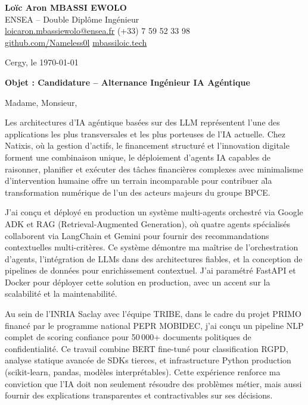 \documentclass[a4paper,11pt]{article}
\begin{document}
\noindent
\textbf{Lo\"ic Aron MBASSI EWOLO} \\
ENSEA -- Double Dipl\^ome Ing\'enieur \\
\href{mailto:loicaron.mbassiewolo@ensea.fr}{loicaron.mbassiewolo@ensea.fr} \quad (+33) 7 59 52 33 98 \\
\href{https://github.com/Nameless0l}{github.com/Nameless0l} \quad \href{https://mbassiloic.tech}{mbassiloic.tech}

\vspace{1em}
\noindent Cergy, le \today

\vspace{1em}
\noindent \textbf{Objet : Candidature -- Alternance Ing\'enieur IA Ag\'entique}

\vspace{1.5em}
\noindent Madame, Monsieur,

\vspace{0.8em}
\noindent Les architectures d'IA ag\'entique bas\'ees sur des LLM repr\'esentent l'une des applications les plus transversales et les plus porteuses de l'IA actuelle. Chez Natixis, o\`u la gestion d'actifs, le financement structur\'e et l'innovation digitale forment une combinaison unique, le d\'eploiement d'agents IA capables de raisonner, planifier et ex\'ecuter des t\^aches financi\`eres complexes avec minimalisme d'intervention humaine offre un terrain incomparable pour contribuer a\` la transformation num\'erique de l'un des acteurs majeurs du groupe BPCE.

\vspace{0.8em}
\noindent J'ai con\c{c}u et d\'eploy\'e en production un syst\`eme multi-agents orchestr\'e via Google ADK et RAG (Retrieval-Augmented Generation), o\`u quatre agents sp\'ecialis\'es collaborent via LangChain et Gemini pour fournir des recommandations contextuelles multi-crit\`eres. Ce syst\`eme d\'emontre ma ma\^itrise de l'orchestration d'agents, l'int\'egration de LLMs dans des architectures fiables, et la conception de pipelines de donn\'ees pour enrichissement contextuel. J'ai param\'etr\'e FastAPI et Docker pour d\'eployer cette solution en production, avec un accent sur la scalabilit\'e et la maintenabilit\'e.

\vspace{0.8em}
\noindent Au sein de l'INRIA Saclay avec l'\'equipe TRIBE, dans le cadre du projet PRIMO financ\'e par le programme national PEPR MOBIDEC, j'ai con\c{c}u un pipeline NLP complet de scoring confiance pour 50\,000+ documents politiques de confidentialit\'e. Ce travail combine BERT fine-tun\'e pour classification RGPD, analyse statique avanc\'ee de SDKs tierces, et infrastructure Python production (scikit-learn, pandas, mod\`eles interpr\'etables). Cette exp\'erience renforce ma conviction que l'IA doit non seulement r\'esoudre des probl\`emes m\'etier, mais aussi fournir des explications transparentes et contractivables sur ses d\'ecisions.
\end{document}
